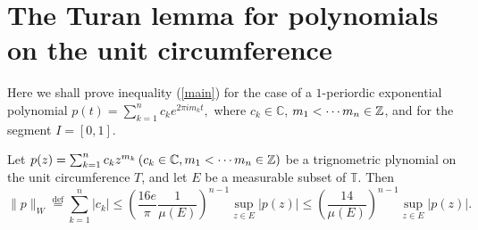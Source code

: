 \section{The Turan lemma for polynomials on the unit circumference}
Here we shall prove inequality (\ref{main}) for the case of a  $1$-periordic exponential polynomial  $p(t)=\sum_{k=1}^{n} c_k e^{2\pi im_k t},$ where $c_k\in \mathbb{C}$, $m_1<\cdots m_n \in \mathbb{Z}$, and for the segment $I=[0,1]$.
\begin{theorem}
  Let $p(z)=\sum_{k=1}^{n} c_k z^{m_k} \left(c_k \in \mathbb{C}, m_1<\cdots m_n \in \mathbb{Z}  \right) $ be a trignometric plynomial on the unit circumference $T$, and let $E$ be a measurable subset of $\mathbb{T}$. Then 
  \begin{equation}
    \|p\|_{W}\overset{\mathrm{def}}{=}\sum_{k=1}^{n} \left| c_k \right| \le \left( \frac{16e}{\pi} \frac{1}{\mu(E)} \right) ^{n-1}\sup_{z\in E}\left| p(z) \right| \le \left( \frac{14}{\mu(E)} \right) ^{n-1}\sup_{z\in E}\left| p(z) \right| .\label{eqn}
  \end{equation}
\end{theorem}
